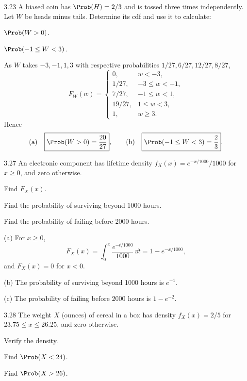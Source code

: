 \documentclass[11pt,oneside]{article}
\begin{document}
\begin{exercise}{3.23}
A biased coin has $\Prob(H)=2/3$ and is tossed three times independently. Let $W$ be heads minus tails. Determine its cdf and use it to calculate:
\begin{exercisesubparts}
\item $\Prob(W>0)$.
\item $\Prob(-1\le W<3)$.
\end{exercisesubparts}
\end{exercise}

\begin{solution}
As $W$ takes $-3,-1,1,3$ with respective probabilities $1/27,6/27,12/27,8/27$,
\[
F_W(w)=\begin{cases}
0,&w<-3,\\1/27,&-3\le w<-1,\\7/27,&-1\le w<1,\\19/27,&1\le w<3,\\1,&w\ge3.
\end{cases}
\]
Hence
\[
\textup{(a)}\quad\boxed{\Prob(W>0)=\frac{20}{27}},\qquad
\textup{(b)}\quad\boxed{\Prob(-1\le W<3)=\frac23}.
\]
\end{solution}

\begin{exercise}{3.27}
An electronic component has lifetime density $f_X(x)=e^{-x/1000}/1000$ for $x\ge0$, and zero otherwise.
\begin{exercisesubparts}
\item Find $F_X(x)$.
\item Find the probability of surviving beyond 1000 hours.
\item Find the probability of failing before 2000 hours.
\end{exercisesubparts}
\end{exercise}

\begin{solution}
\noindent\textup{(a)} For $x\ge0$,
\[
F_X(x)=\int_0^x\frac{e^{-t/1000}}{1000}\,\dd t=1-e^{-x/1000},
\]
and $F_X(x)=0$ for $x<0$.\par\medskip
\noindent\textup{(b)} The probability of surviving beyond 1000 hours is $\boxed{e^{-1}}$.\par\medskip
\noindent\textup{(c)} The probability of failing before 2000 hours is $\boxed{1-e^{-2}}$.
\end{solution}

\begin{exercise}{3.28}
The weight $X$ (ounces) of cereal in a box has density $f_X(x)=2/5$ for $23.75\le x\le26.25$, and zero otherwise.
\begin{exercisesubparts}
\item Verify the density.
\item Find $\Prob(X<24)$.
\item Find $\Prob(X>26)$.
\end{exercisesubparts}
\end{exercise}
\end{document}
